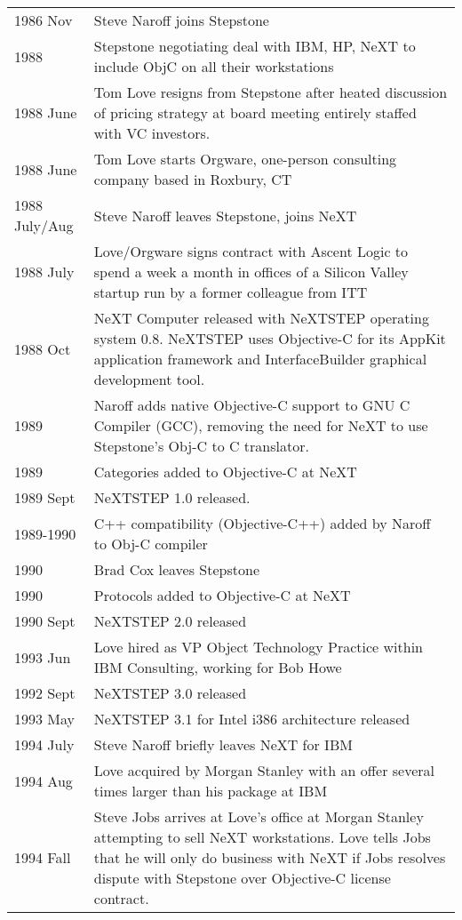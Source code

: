 \documentclass[acmsmall,screen]{acmart}
\begin{document}
\begin{longtable}{lp{4.40in}}
1986 Nov	& Steve Naroff joins Stepstone \\
1988 	& Stepstone negotiating deal with IBM, HP, NeXT to include ObjC on all their workstations \\
1988 June	& Tom Love resigns from Stepstone after heated discussion of pricing strategy at board meeting entirely staffed with VC investors. \\
1988 June	& Tom Love starts Orgware, one-person consulting company based in Roxbury, CT \\
1988 July/Aug	& Steve Naroff leaves Stepstone, joins NeXT \\
1988 July	& Love/Orgware signs contract with Ascent Logic to spend a week a month in offices of a Silicon Valley startup run by a former colleague from ITT \\
1988 Oct	& NeXT Computer released with NeXTSTEP operating system 0.8. NeXTSTEP uses Objective-C for its AppKit application framework and InterfaceBuilder graphical development tool. \\
1989	& Naroff adds native Objective-C support to GNU C Compiler (GCC), removing the need for NeXT to use Stepstone's Obj-C to C translator. \\
1989	& Categories added to Objective-C at NeXT \\
1989 Sept	& NeXTSTEP 1.0 released. \\
1989-1990	& C++ compatibility (Objective-C++) added by Naroff to Obj-C compiler \\
1990 	& Brad Cox leaves Stepstone \\
1990 	& Protocols added to Objective-C at NeXT \\
1990 Sept	& NeXTSTEP 2.0 released \\
1993 Jun	& Love hired as VP Object Technology Practice within IBM Consulting, working for Bob Howe \\
1992 Sept	& NeXTSTEP 3.0 released \\
1993 May	& NeXTSTEP 3.1 for Intel i386 architecture released \\
1994 July	& Steve Naroff briefly leaves NeXT for IBM \\
1994 Aug	& Love acquired by Morgan Stanley with an offer several times larger than his package at IBM \\
1994 Fall	& Steve Jobs arrives at Love's office at Morgan Stanley attempting to sell NeXT workstations. Love tells Jobs that he will only do business with NeXT if Jobs resolves dispute with Stepstone over Objective-C license contract. \\

\end{longtable}
\end{document}
